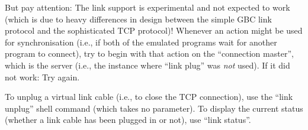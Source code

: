 \documentclass[fleqn,english,openany]{scrbook}
\begin{document}
But pay attention: The link support is experimental and not expected to work (which is due to heavy differences in design
between the simple GBC link protocol and the sophisticated TCP protocol)! Whenever an action might be used for
synchronisation (i.e., if both of the emulated programs wait for another program to connect), try to begin with that
action on the “connection master”, which is the server (i.e., the instance where “link plug” was {\em not} used). If it
did not work: Try again.

To unplug a virtual link cable (i.e., to close the TCP connection), use the “link unplug” shell command (which takes no
parameter). To display the current status (whether a link cable has been plugged in or not), use “link status”.
\end{document}
